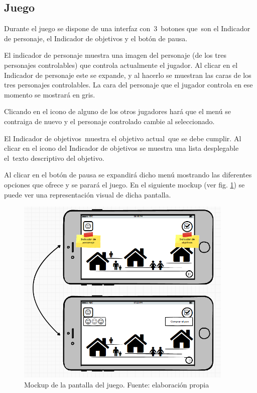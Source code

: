 \subsection[Juego]{ Juego}
\label{mockupsJuego}
\hypertarget{Toc484614221}{}{
Durante el juego se dispone de una interfaz con\ 3\ botones que\ son el Indicador de personaje, el Indicador de
objetivos y el bot\'on de pausa.}

{
El indicador de personaje muestra una imagen del personaje (de los tres personajes controlables) que controla
actualmente el jugador. Al clicar en el Indicador de personaje este se expande, y al hacerlo se muestran las caras de
los tres personajes controlables. La cara del personaje que el jugador controla en ese momento se mostrar\'a en gris.}

{
Clicando en el icono de alguno de los otros jugadores har\'a que el men\'u se contraiga de nuevo y el personaje
controlado cambie al seleccionado.}

{
El Indicador de objetivos\ muestra el objetivo actual\ que se debe cumplir. Al clicar en el icono del Indicador de
objetivos se muestra una lista desplegable el\ texto descriptivo del objetivo.}

{
Al clicar en el bot\'on de pausa se expandir\'a dicho men\'u mostrando las diferentes opciones que ofrece y se parar\'a
el juego. En el siguiente mockup (ver fig. \ref{mockupJuego}) se puede ver una representaci\'on visual de dicha pantalla.}

\begin{figure}
    \begin{center}
\includegraphics[width=4.08763in,height=3.53967in]{anexos/GDD/GDD-img007.png} 
    \caption{Mockup de la pantalla del juego. Fuente: elaboración propia}
    \label{mockupJuego}
    \end{center}
 
\end{figure}


